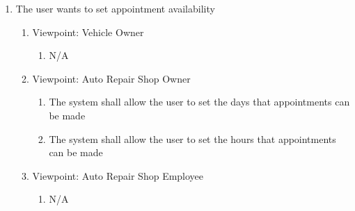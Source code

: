\documentclass[12pt]{article}
\begin{document}
\begin{enumerate}[resume*=business_events]
	\item The user wants to set appointment availability
	      \begin{enumerate}[VP\arabic*.]
		      \item Viewpoint: Vehicle Owner
		            \begin{enumerate}
			            \item[] N/A
		            \end{enumerate}
		      \item Viewpoint: Auto Repair Shop Owner
		            \begin{enumerate}
			            \item The system shall allow the user to set the days that appointments can be made
			            \item The system shall allow the user to set the hours that appointments can be made
		            \end{enumerate}
		      \item Viewpoint: Auto Repair Shop Employee
		            \begin{enumerate}
			            \item[] N/A
		            \end{enumerate}
	      \end{enumerate}
\end{enumerate}
\end{document}
